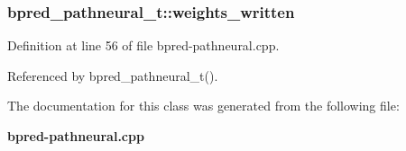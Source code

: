 \subsubsection[{weights\_\-written}]{ {\bf bpred\_\-pathneural\_\-t::weights\_\-written}\hspace{0.3cm}{\tt  [protected]}}\label{classbpred__pathneural__t_3fbb2d6bd5f4ef3a5bb85a6516ed6301}




Definition at line 56 of file bpred-pathneural.cpp.

Referenced by bpred\_\-pathneural\_\-t().

The documentation for this class was generated from the following file:\begin{CompactItemize}
\item 
{\bf bpred-pathneural.cpp}\end{CompactItemize}
